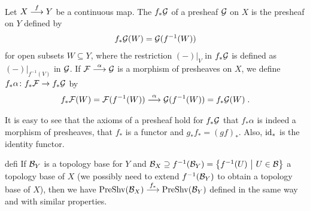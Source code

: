 \documentclass[a4paper,parskip=half,numbers=enddot, DIV=12]{scrreprt}
\begin{document}
    \begin{defi} 
        Let $X\morphism[f] Y$ be a continuous map.  The  $f_*\mathcal{G}$ of a presheaf $\mathcal{G}$ on $X$  is the presheaf on $Y$ defined by 
        \begin{align*}
            f_*\mathcal{G}(W) = \mathcal{G}(f^{-1}(W))
        \end{align*}
        for open subsets $W\subseteq Y$, where the restriction $(-)|_V$ in $f_*\mathcal{G}$ is defined as $(-)|_{f^{-1}(V)}$ in $\mathcal{G}$. If $\Ff\morphism[\alpha] \Gg$ is a morphism of presheaves on $X$, we define $f_*\alpha\colon f_*\Ff\morphism f_*\Gg$ by 
        \begin{align*}
        	f_*\Ff(W) = \Ff(f^{-1}(W)) \morphism[\alpha] \Gg(f^{-1}(W)) = f_*\Gg(W)\;.
        \end{align*}
    \end{defi}
    \begin{fact}
    	It is easy to see that the axioms of a presheaf hold for $f_*\mathcal{G}$ that $f_*\alpha$ is indeed a morphism of presheaves, that $f_*$ is a functor and $g_*f_* = (gf)_*$. Also, $\operatorname{id}_*$ is the identity functor.
    \end{fact}
    \begin{varthm}{defi}
        If $\mathcal{B}_Y$ is a topology base for $Y$ and $\mathcal{B}_X\supseteq f^{-1}(\mathcal{B}_Y) = \left\{f^{-1}(U) \ \middle|\  U\in\mathcal{B}\right\}$ a topology base of $X$ (we possibly need to extend $f^{-1}(\mathcal{B}_Y)$ to obtain a topology base of $X$), then we have $\cat{PreShv}(\Bb_X) \morphism[f_*]\cat{PreShv}(\Bb_Y)$ defined in the same way and with similar properties.
    \end{varthm}
\end{document}
